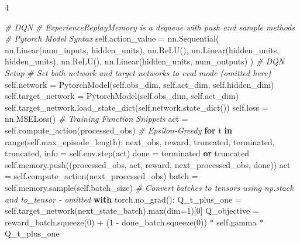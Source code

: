 \documentclass{article}
\newenvironment{Shaded}{\CodeFontSize\setlength{\topsep}{\CodeBlockSkip}\setlength{\partopsep}{0pt}}{}
\newcommand{\BuiltInTok}[1]{\textcolor[rgb]{0.00,0.50,0.00}{#1}}
\newcommand{\CommentTok}[1]{\textcolor[rgb]{0.38,0.63,0.69}{\textit{#1}}}
\newcommand{\ControlFlowTok}[1]{\textcolor[rgb]{0.00,0.44,0.13}{\textbf{#1}}}
\newcommand{\DecValTok}[1]{\textcolor[rgb]{0.25,0.63,0.44}{#1}}
\newcommand{\KeywordTok}[1]{\textcolor[rgb]{0.00,0.44,0.13}{\textbf{#1}}}
\newcommand{\NormalTok}[1]{#1}
\newcommand{\OperatorTok}[1]{\textcolor[rgb]{0.40,0.40,0.40}{#1}}
\newcommand{\VariableTok}[1]{\textcolor[rgb]{0.10,0.09,0.49}{#1}}
\newcommand{\CodeFontSize}{\fontsize{3.6}{4}\selectfont}
\newlength{\CodeBlockSkip}
\newcommand{\NumCodeColumns}{4}  %
\begin{document}
\begin{multicols*}{\NumCodeColumns}
\begin{Shaded}
\begin{Highlighting}[]
\CommentTok{\# DQN}
\CommentTok{\# ExperienceReplayMemory is a dequeue with push and sample methods}
\CommentTok{\# Pytorch Model Syntax}
\VariableTok{self}\NormalTok{.action\_value }\OperatorTok{=}\NormalTok{ nn.Sequential(}
\NormalTok{  nn.Linear(num\_inputs, hidden\_units),}
\NormalTok{  nn.ReLU(),}
\NormalTok{  nn.Linear(hidden\_units, hidden\_units),}
\NormalTok{  nn.ReLU(),}
\NormalTok{  nn.Linear(hidden\_units, num\_outputs)}
\NormalTok{)}
\CommentTok{\# DQN Setup}
\CommentTok{\# Set both network and target networks to eval mode (omitted here)}
\VariableTok{self}\NormalTok{.network }\OperatorTok{=}\NormalTok{ PytorchModel(}\VariableTok{self}\NormalTok{.obs\_dim, }\VariableTok{self}\NormalTok{.act\_dim, }\VariableTok{self}\NormalTok{.hidden\_dim)}
\VariableTok{self}\NormalTok{.target\_network }\OperatorTok{=}\NormalTok{ PytorchModel(}\VariableTok{self}\NormalTok{.obs\_dim, }\VariableTok{self}\NormalTok{.act\_dim)}
\VariableTok{self}\NormalTok{.target\_network.load\_state\_dict(}\VariableTok{self}\NormalTok{.network.state\_dict())}
\VariableTok{self}\NormalTok{.loss }\OperatorTok{=}\NormalTok{ nn.MSELoss()}
\CommentTok{\# Training Function Snippets}
\NormalTok{act }\OperatorTok{=} \VariableTok{self}\NormalTok{.compute\_action(processed\_obs) }\CommentTok{\# Epsilon{-}Greedy}
\ControlFlowTok{for}\NormalTok{ t }\KeywordTok{in} \BuiltInTok{range}\NormalTok{(}\VariableTok{self}\NormalTok{.max\_episode\_length):}
\NormalTok{  next\_obs, reward, truncated, terminated, truncated, info }\OperatorTok{=} \VariableTok{self}\NormalTok{.env.step(act)}
\NormalTok{  done }\OperatorTok{=}\NormalTok{ terminated }\KeywordTok{or}\NormalTok{ truncated}
  \VariableTok{self}\NormalTok{.memory.push((processed\_obs, act, reward, next\_processed\_obs, done))}
\NormalTok{  act }\OperatorTok{=} \VariableTok{self}\NormalTok{.compute\_action(next\_processed\_obs)}
\NormalTok{  batch }\OperatorTok{=} \VariableTok{self}\NormalTok{.memory.sample(}\VariableTok{self}\NormalTok{.batch\_size)}
  \CommentTok{\# Convert batches to tensors using np.stack and to\_tensor {-} omitted}
  \ControlFlowTok{with}\NormalTok{ torch.no\_grad():}
\NormalTok{    Q\_t\_plus\_one }\OperatorTok{=} \VariableTok{self}\NormalTok{.target\_network(next\_state\_batch).}\BuiltInTok{max}\NormalTok{(dim}\OperatorTok{=}\DecValTok{1}\NormalTok{)[}\DecValTok{0}\NormalTok{] }
\NormalTok{    Q\_objective }\OperatorTok{=}\NormalTok{ reward\_batch.squeeze(}\DecValTok{0}\NormalTok{) }\OperatorTok{+}\NormalTok{ (}\DecValTok{1} \OperatorTok{{-}}\NormalTok{ done\_batch.squeeze(}\DecValTok{0}\NormalTok{)) }\OperatorTok{*} \VariableTok{self}\NormalTok{.gamma }\OperatorTok{*}\NormalTok{ Q\_t\_plus\_one}
  

\end{Highlighting}
\end{Shaded}
\end{multicols*}
\end{document}
